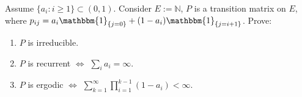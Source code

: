 \documentclass[../main]{subfiles}
\begin{document}
%
%
\begin{problem}\label{pro:5}
  Assume \(\{a_i: i \geq 1\} \subset (0,1)\). Consider \(E:=\mathbb{N}\), \(P\) is a transition matrix on \(E\),
  where \(p_{ij}=a_i \mathbbm{1}_{\{j=0\}} + (1-a_i)\mathbbm{1}_{\{j=i+1\}}\).
  Prove:
  \begin{enumerate}
    \item \(P\) is irreducible.
    \item \(P\) is recurrent \( \iff \) \(\sum_{i}a_i=\infty\).
    \item \(P\) is ergodic \(\iff \) \(\sum_{k=1}^{\infty} \prod_{i=1}^{k-1} (1-a_i)< \infty\).
  \end{enumerate}
\end{problem}
\end{document}
